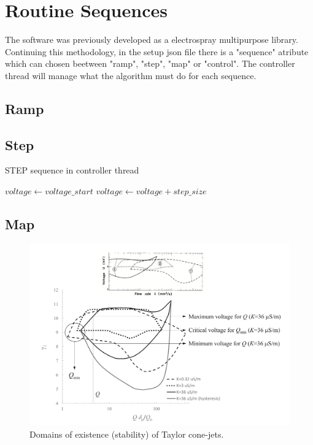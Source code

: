 \section{Routine Sequences}
\label{sec:routine_sequences}

    The software was previously developed as a electrospray multipurpose library\cite{Monica}. 
    Continuing this methodology, in the setup json file there is a "sequence" atribute which can chosen beetween "ramp", "step", "map" or "control".
    The controller thread will manage what the algorithm must do for each sequence.

\subsection{Ramp}



\subsection{Step}


\begin{algorithm}
    \caption{STEP sequence in controller thread}\label{alg:stepping_algorithm}
    \begin{algorithmic}
        \State $voltage \gets voltage\_start$
         
            \State {}
            \State {}
            \State $voltage \gets voltage + step\_size$
        \EndWhile
    \EndProcedure

    \end{algorithmic}
\end{algorithm}

\subsection{Map}

    \begin{figure}[H]
        \center
        \includegraphics[width=13cm]{Figuras/ganan_calvo_map.png}
        \caption{Domains of existence (stability) of Taylor cone-jets. \cite{gananCalvo} }
        \label{fig:ganan_calvo_fig}
    \end{figure}


